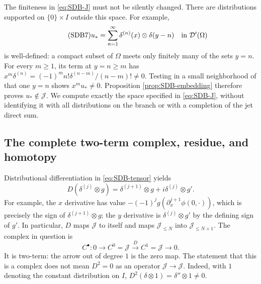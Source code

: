 The finiteness in \eqref{eq:SDB-J} must not be silently changed.
There are distributions supported on $\{0\}\times I$ outside this
space. For example,
\begin{equation}\tag{SDB7}\label{eq:SDB-locallyfinite}
 u_*=\sum_{n=1}^{\infty}\delta^{(n)}(x)\otimes\delta(y-n)
 \quad\hbox{in }\mathcal D'(\Omega)
\end{equation}
is well-defined: a compact subset of $\Omega$ meets only finitely many
of the sets $y=n$. For every $m\geq1$, its term at $y=n\geq m$
has
$x^m\delta^{(n)}=(-1)^m n!\delta^{(n-m)}/(n-m)!\ne0$.
Testing in a small neighborhood of that one $y=n$ shows
$x^m u_*\ne0$. Proposition \ref{prop:SDB-embedding} therefore proves
$u_*\notin\mathcal J$. We compute exactly the space specified in
\eqref{eq:SDB-J}, without identifying it with all distributions on the
branch or with a completion of the jet direct sum.

\subsection{The complete two-term complex, residue, and homotopy}

Distributional differentiation in \eqref{eq:SDB-tensor} yields
\begin{equation}\tag{SDB8}\label{eq:SDB-Daction}
 D(\delta^{(j)}\otimes g)
 =\delta^{(j+1)}\otimes g
       +i\delta^{(j)}\otimes g'.
\end{equation}
For example, the $x$ derivative has value
$-(-1)^j g(\partial_x^{j+1}\phi(0,\cdot))$, which is precisely
the sign of $\delta^{(j+1)}\otimes g$; the $y$ derivative is
$\delta^{(j)}\otimes g'$ by the defining sign of $g'$.
In particular, $D$ maps $\mathcal J$ to itself and maps
$\mathcal J_{\leq N}$ into $\mathcal J_{\leq N+1}$.
The complex in question is
\begin{equation}\tag{SDB9}\label{eq:SDB-complex}
 C^\bullet:
 0\longrightarrow C^0=\mathcal J
   \xrightarrow{\ D\ }C^1=\mathcal J\longrightarrow0.
\end{equation}
It is two-term: the arrow out of degree $1$ is the zero map.
The statement that this is a complex does not mean $D^2=0$ as an
operator $\mathcal J\to\mathcal J$. Indeed, with $1$ denoting the
constant distribution on $I$, $D^2(\delta\otimes1)=
\delta''\otimes1\ne0$.

